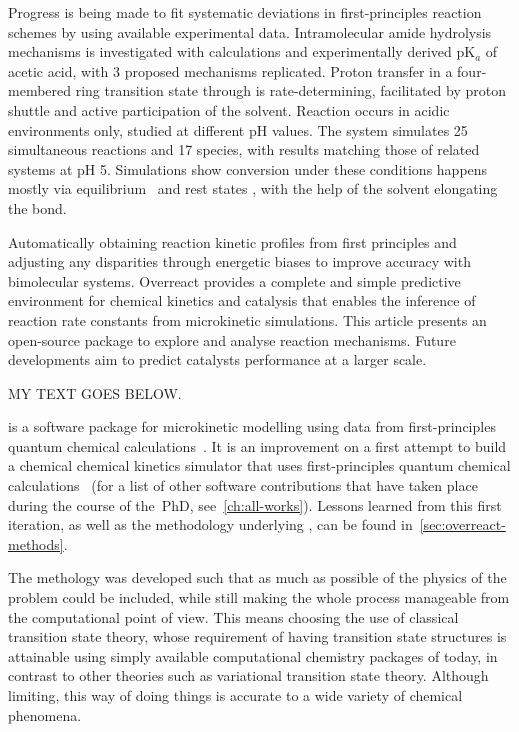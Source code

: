 Progress is being made to fit systematic deviations in first-principles reaction schemes by using available experimental data.
Intramolecular amide hydrolysis mechanisms is investigated with calculations and experimentally derived pK$_a$ of acetic acid, with 3 proposed mechanisms replicated.
Proton transfer in a four-membered ring transition state through  is rate-determining, facilitated by proton shuttle and active participation of the solvent.
Reaction occurs in acidic environments only, studied at different pH values.
The system simulates 25 simultaneous reactions and 17 species, with results matching those of related systems at pH 5.
Simulations show conversion under these conditions happens mostly via equilibrium~ and rest states ,
with the help of the solvent elongating the  bond.

Automatically obtaining reaction kinetic profiles from first principles and adjusting any disparities through energetic biases to improve accuracy with bimolecular systems.
Overreact provides a complete and simple predictive environment for chemical kinetics and catalysis that enables the inference of reaction rate constants from microkinetic simulations.
This article presents an open-source package to explore and analyse reaction mechanisms. Future developments aim to predict catalysts performance at a larger scale.

MY TEXT GOES BELOW.

\overreact is a software package for microkinetic modelling using data from
first-principles quantum chemical
calculations~\cite{Schneider_2022,overreact2021zenodo}.
It is an improvement on a first attempt to build a
chemical chemical kinetics simulator that uses first-principles quantum
chemical calculations~\cite{pyrrole2019zenodo} (for a list of other software
contributions that have taken place during the course of the~PhD, see~\cref{ch:all-works}).
Lessons learned from this first iteration, as well as the methodology
underlying \overreact, can be found in~\cref{sec:overreact-methods}.

The methology was developed such that as much as possible of the physics of the problem could be included,
while still making the whole process manageable from the computational point of view.
This means choosing the use of classical transition state theory,
whose requirement of having transition state structures is attainable
using simply available computational chemistry packages of today, in contrast to other theories
such as variational transition state theory.
Although limiting, this way of doing things is accurate to a wide variety of chemical phenomena.

